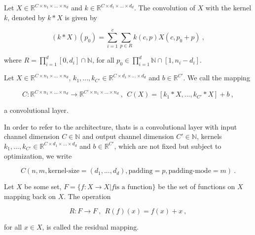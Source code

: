 \begin{definition}

    Let $X \in \mathbb R^{C \times n_1 \times ... \times n_d}$ and $k \in \mathbb R^{C \times d_1 \times ... \times d_d}$.
    The convolution of $X$ with the kernel $k$, denoted by $k * X$ is given by
    
        $$(k * X)(p_{0}) = \sum_{i=1}^c \sum_{p \in R} k(c, p) X(c, p_{0} + p) ~,$$

    where $R = \prod_{i=1}^d [0, d_i] \cap \mathbb N$, for all $p_0 \in \prod_{i=1}^{d} \mathbb{N} \cap [1, n_i - d_i]$.

\end{definition}

\begin{definition}
    Let $X \in \mathbb R^{C \times n_1 \times ... \times n_d}$, $k_1, ..., k_{C'} \in \mathbb R^{C \times d_1 \times ... \times d_d}$ and $b \in \mathbb R^{C'}$.
    We call the mapping 

        $$ C : \mathbb R^{C \times n_1 \times ... \times n_d} \to \mathbb R^{C' \times n_1 \times ... \times n_d} ~, ~~
        C(X) = [k_1 * X, ..., k_{C'} * X] + b ~, $$

    a convolutional layer.
\end{definition}

In order to refer to the architecture,
thats is a convolutional layer with input channel dimension $C \in \mathbb N$ and output channel dimension $C' \in \mathbb N$,
kernels $k_1, ..., k_{C'} \in \mathbb R^{C \times d_1 \times ... \times d_d}$ and $b \in \mathbb R^{C'}$,
which are not fixed but subject to optimization, 
we write 

    $$C(n, m, \text{kernel-size}=(d_1, ..., d_d), \text{padding}=p, \text{padding-mode}=m) ~.$$

\begin{definition}
    Let $X$ be some set, $F = \{f : X \to X | f \text{is a function} \}$ be the set of functions on $X$ mapping back on $X$.
    The operation
    
        $$ R : F \to F ~, ~~ R(f)(x) = f(x) + x ~, $$

    for all $x \in X$, is called the residual mapping.
\end{definition}